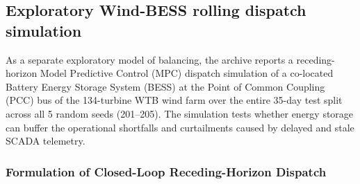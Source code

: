 \documentclass[
  journal]{IEEEtran}
\begin{document}
\FloatBarrier

\subsection*{Exploratory Wind-BESS rolling dispatch
simulation}\label{exploratory-wind-bess-rolling-dispatch-simulation}

As a separate exploratory model of balancing, the archive reports a
receding-horizon Model Predictive Control (MPC) dispatch simulation of a
co-located Battery Energy Storage System (BESS) at the Point of Common
Coupling (PCC) bus of the 134-turbine WTB wind farm over the entire
35-day test split across all 5 random seeds (201--205). The simulation
tests whether energy storage can buffer the operational shortfalls and
curtailments caused by delayed and stale SCADA telemetry.

\subsubsection*{Formulation of Closed-Loop Receding-Horizon
Dispatch}\label{formulation-of-closed-loop-receding-horizon-dispatch}
\end{document}
